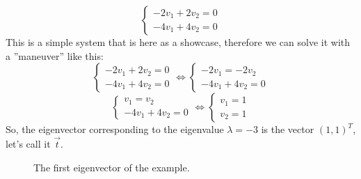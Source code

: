 \documentclass[600paper, 11pt,twoside,openany]{kdp}
\begin{document}
\[
    \begin{cases}
      -2v_1 + 2v_2  = 0\\
      -4v_1 + 4v_2 = 0
    \end{cases}
\]
\indent This is a simple system that is here as a showcase, therefore we can solve it with a ”maneuver” like this:
\[
    \begin{cases}
     -2v_1 + 2v_2  = 0\\
     -4v_1 + 4v_2 = 0
    \end{cases}
	\Leftrightarrow
	  \begin{cases}
     -2v_1 = -2v_2  \\
     -4v_1 + 4v_2 = 0
    \end{cases}
\]
\[
    \begin{cases}
     v_1 = v_2 \\
     -4v_1 + 4v_2 = 0
    \end{cases}
	\Leftrightarrow
	  \begin{cases}
     v_1 = 1 \\
     v_2 = 1
    \end{cases}
\]
\indent So, the eigenvector corresponding to the eigenvalue  $\lambda = -3$ is the vector $(1,1)^T$, let’s call it $\overrightarrow{t}$.
\newpage
\begin{figure}[h!]
\begin{center}
\end{center}
\caption{The first eigenvector of the example.}
\end{figure}
\end{document}
